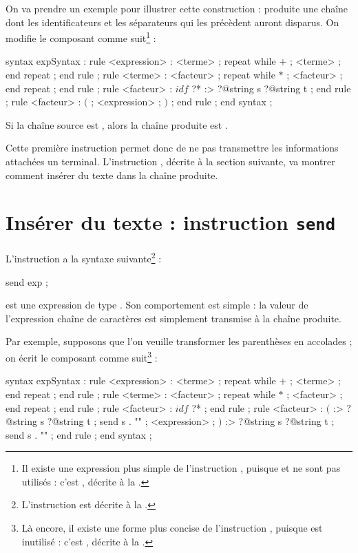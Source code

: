 On va prendre un exemple pour illustrer cette construction : produite une chaîne dont les identificateurs et les séparateurs qui les précèdent auront disparus. On modifie le composant  comme suit\footnote{Il existe une expression plus simple de l'instruction , puisque  et  ne sont pas utilisés : c'est , décrite  à la .} :
\begin{galgascode}
syntax expSyntax :
  rule <expression> :
    <terme> ;
    repeat while $+$ ; <terme> ; end repeat ;
  end rule ;
  rule <terme> :
    <facteur> ;
    repeat while $*$ ; <facteur> ; end repeat ;
  end rule ;
  rule <facteur> :
    $idf$ ?* :> ?@string s ?@string t ;
  end rule ;
  rule <facteur> :
    $($ ;
    <expression> ;
    $)$ ;
  end rule ;
end syntax ;
\end{galgascode}

Si la chaîne source est , alors la chaîne produite est .

Cette première instruction permet donc de ne pas transmettre les informations attachées un terminal. L'instruction , décrite à la section suivante, va montrer comment insérer du texte dans la chaîne produite.










\section{Insérer du texte : instruction \texttt{send}}

L'instruction  a la syntaxe suivante\footnote{L'instruction  est décrite à la .} :
\begin{galgascode}
send exp ;
\end{galgascode}

 est une expression de type . Son comportement est simple : la valeur de l'expression chaîne de caractères est simplement transmise à la chaîne produite.

Par exemple, supposons que l'on veuille transformer les parenthèses en accolades ; on écrit le composant  comme suit\footnote{Là encore, il existe une forme plus concise de l'instruction , puisque  est inutilisé : c'est , décrite  à la .} :
\begin{galgascode}
syntax expSyntax :
  rule <expression> :
    <terme> ;
    repeat while $+$ ; <terme> ; end repeat ;
  end rule ;
  rule <terme> :
    <facteur> ;
    repeat while $*$ ; <facteur> ; end repeat ;
  end rule ;
  rule <facteur> :
    $idf$ ?* ;
  end rule ;
  rule <facteur> :
    $($ :> ?@string s ?@string t ; send s . "{" ;
    <expression> ;
    $)$ :> ?@string s ?@string t ; send s . "}" ;
  end rule ;
end syntax ;
\end{galgascode}

